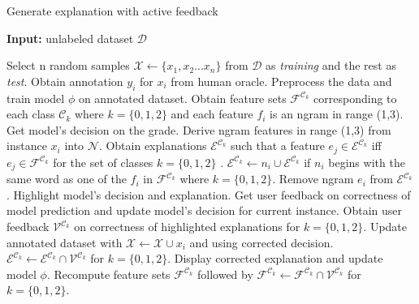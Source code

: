 \documentclass[letterpaper, 10 pt, conference]{ieeeconf}  %
\begin{document}
\begin{algorithm}[H]
  \caption{Generate explanation with active feedback}
  \label{getExpln}
  \begin{flushleft}
     \textbf{Input:} unlabeled dataset $\mathcal{D}$\\
  \end{flushleft}
  \begin{algorithmic}[1]
  \State Select n random samples $\mathcal{X} \gets \{x_1, x_2...x_n\}$ from $\mathcal{D}$ as \textit{training} and the rest as \textit{test}.
	\State Obtain annotation $y_i$ for $x_i$ from human oracle.
\EndFor
	\State Preprocess the data and train model $\phi$ on annotated dataset.
\State Obtain feature sets $\mathcal{F}^{\mathcal{C}_k}$ corresponding to each class $\mathcal{C}_k$ where $k = \{0,1,2\}$ and each feature $f_i$ is an ngram in range (1,3).
	\State Get model's decision on the grade.
	\State Derive ngram features in range (1,3) from instance $x_i$ into $\mathcal{N}$.
	\State Obtain explanations $\mathcal{E}^{\mathcal{C}_k}$ such that a feature $e_j \in \mathcal{E}^{\mathcal{C}_k}$ iff $e_j \in \mathcal{F}^{\mathcal{C}_k}$ for the set of classes $k = \{0,1,2\}$ .
		\State $\mathcal{E}^{\mathcal{C}_k} \gets n_i \cup \mathcal{E}^{\mathcal{C}_k}$ if $n_i$ begins with the same word as one of the $f_i$ in $\mathcal{F}^{\mathcal{C}_k}$ where $k = \{0,1,2\}$.
	\EndFor
				\State Remove ngram $e_i$ from $\mathcal{E}^{\mathcal{C}_k}$.
			\EndIf
		\EndFor
	\EndFor 
	\State Highlight model's decision and explanation.
	\State Get user feedback on correctness of model prediction and update model's decision for current instance.
	\State Obtain user feedback $\mathcal{V}^{\mathcal{C}_k}$ on correctness of highlighted explanations for $k = \{0,1,2\}$.
	\State Update annotated dataset with $\mathcal{X} \gets \mathcal{X} \cup x_i$ and using corrected decision.
	\State $\mathcal{E}^{\mathcal{C}_k} \gets \mathcal{E}^{\mathcal{C}_k} \cap \mathcal{V}^{\mathcal{C}_k}$ for $k = \{0,1,2\}$.
	\State Display corrected explanation and update model $\phi$.
	\State Recompute feature sets $\mathcal{F}^{\mathcal{C}_k}$ followed by $\mathcal{F}^{\mathcal{C}_k} \gets \mathcal{F}^{\mathcal{C}_k} \cap \mathcal{V}^{\mathcal{C}_k}$ for $k = \{0,1,2\}$.
\EndFor
  \end{algorithmic}
\end{algorithm}
\end{document}
